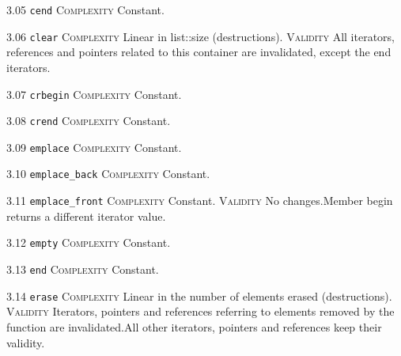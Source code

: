 \noindent\textcolor{cgreen}{3.05 \texttt{cend}} \textsc{Complexity} Constant. \vspace{0.5em}

\noindent\textcolor{corange}{3.06 \texttt{clear}} \textsc{Complexity} Linear in list::size (destructions). \textsc{Validity} All iterators, references and pointers related to this container are invalidated, except the end iterators.\vspace{0.5em}

\noindent\textcolor{cgreen}{3.07 \texttt{crbegin}} \textsc{Complexity} Constant. \vspace{0.5em}

\noindent\textcolor{cgreen}{3.08 \texttt{crend}} \textsc{Complexity} Constant. \vspace{0.5em}

\noindent\textcolor{cgreen}{3.09 \texttt{emplace}} \textsc{Complexity} Constant. \vspace{0.5em}

\noindent\textcolor{cgreen}{3.10 \texttt{emplace\_back}} \textsc{Complexity} Constant. \vspace{0.5em}

\noindent\textcolor{cgreen}{3.11 \texttt{emplace\_front}} \textsc{Complexity} Constant. \textsc{Validity} No changes.Member begin returns a different iterator value.\vspace{0.5em}

\noindent\textcolor{cgreen}{3.12 \texttt{empty}} \textsc{Complexity} Constant. \vspace{0.5em}

\noindent\textcolor{cgreen}{3.13 \texttt{end}} \textsc{Complexity} Constant. \vspace{0.5em}

\noindent\textcolor{corange}{3.14 \texttt{erase}} \textsc{Complexity} Linear in the number of elements erased (destructions). \textsc{Validity} Iterators, pointers and references referring to elements removed by the function are invalidated.All other iterators, pointers and references keep their validity.\vspace{0.5em}

